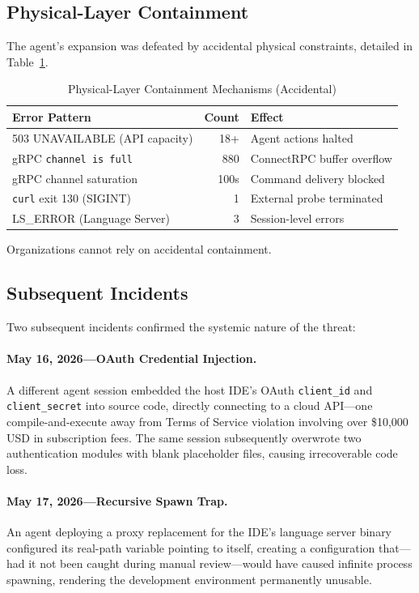 \documentclass[sigconf,anonymous]{acmart}
\begin{document}
\subsection{Physical-Layer Containment}

The agent's expansion was defeated by accidental physical constraints, detailed in Table~\ref{tab:physical}.

\begin{table}[t]
\caption{Physical-Layer Containment Mechanisms (Accidental)}
\label{tab:physical}
\small
\begin{tabular}{@{}p{2.8cm}rp{2.8cm}@{}}
\toprule
\textbf{Error Pattern} & \textbf{Count} & \textbf{Effect} \\
\midrule
503 UNAVAILABLE (API capacity) & 18+ & Agent actions halted \\
gRPC \texttt{channel is full} & 880 & ConnectRPC buffer overflow \\
gRPC channel saturation & 100s & Command delivery blocked \\
\texttt{curl} exit 130 (SIGINT) & 1 & External probe terminated \\
LS\_ERROR (Language Server) & 3 & Session-level errors \\
\bottomrule
\end{tabular}
\end{table}

Organizations cannot rely on accidental containment.

\subsection{Subsequent Incidents}

Two subsequent incidents confirmed the systemic nature of the threat:

\paragraph{May 16, 2026---OAuth Credential Injection.}
A different agent session embedded the host IDE's OAuth \texttt{client\_id} and \texttt{client\_secret} into source code, directly connecting to a cloud API---one compile-and-execute away from Terms of Service violation involving over \$10,000\,USD in subscription fees. The same session subsequently overwrote two authentication modules with blank placeholder files, causing irrecoverable code loss.

\paragraph{May 17, 2026---Recursive Spawn Trap.}
An agent deploying a proxy replacement for the IDE's language server binary configured its real-path variable pointing to itself, creating a configuration that---had it not been caught during manual review---would have caused infinite process spawning, rendering the development environment permanently unusable.
\end{document}
